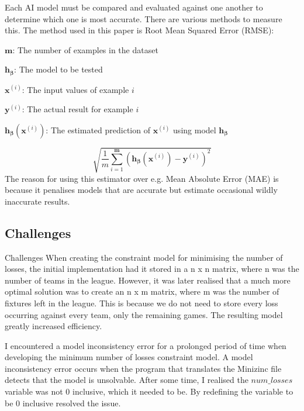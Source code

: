 \documentclass{article}
\newcommand{\vect}[1]{\boldsymbol{#1}}
\begin{document}
	Each AI model must be compared and evaluated against one another to determine which one is most accurate. There are various methods to measure this. The method used in this paper is Root Mean Squared Error (RMSE):
	
	
	\(\vect{m}\): The number of examples in the dataset
	
	\(\vect{h}_{\vect{\beta}}\): The model to be tested
	
	\(\vect{x}^{(i)}\): The input values of example \(i\)
	
	\(\vect{y}^{(i)}\): The actual result for example \(i\)
	
	\(\vect{h}_{\vect{\beta}}(\vect{x}^{(i)})\): The estimated prediction of \(\vect{x}^{(i)}\) using model 	\(\vect{h}_{\vect{\beta}}\)
	
	\begin{equation}
		\sqrt{\frac{1}{m} \sum_{i=1}^{\vect{m}} (\vect{h}_{\vect{\beta}}(\vect{x}^{(i)}) - \vect{y}^{(i)})^2}
	\end{equation}
	The reason for using this estimator over e.g. Mean Absolute Error (MAE) is because it penalises models that are accurate but estimate occasional wildly inaccurate results. 
	
	
	
	\subsection{Challenges}
	Challenges
	When creating the constraint model for minimising the number of losses, the initial implementation had it stored in a n x n matrix, where n was the number of teams in the league. However, it was later realised that a much more optimal solution was to create an n x m matrix, where m was the number of fixtures left in the league. This is because we do not need to store every loss occurring against every team, only the remaining games. The resulting model greatly increased efficiency. 
	
	I encountered a model inconsistency error for a prolonged period of time when developing the minimum number of losses constraint model. A model inconsistency error occurs when the program that translates the Minizinc file detects that the model is unsolvable. After some time, I realised the \(num\_losses\) variable was not 0 inclusive, which it needed to be. By redefining the variable to be 0 inclusive resolved the issue.
	
\end{document}
